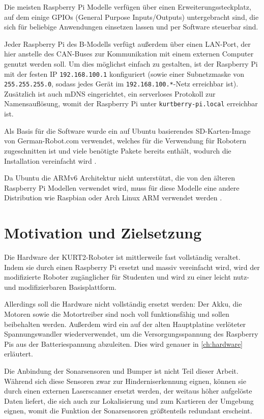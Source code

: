 \documentclass[german]{thesis_KBS}
\newcommand{\code}[1]{\texttt{#1}}  %
\begin{document}
Die meisten Raspberry Pi Modelle verfügen über einen Erweiterungssteckplatz, auf
dem einige GPIOs (General Purpose Inputs/Outputs) untergebracht sind, die sich
für beliebige Anwendungen einsetzen lassen und per Software steuerbar sind.

Jeder Raspberry Pi des B-Modells verfügt außerdem über einen LAN-Port, der hier
anstelle des CAN-Buses zur Kommunikation mit einem externen Computer genutzt
werden soll. Um dies möglichst einfach zu gestalten, ist der Raspberry Pi mit
der festen IP \code{192.168.100.1} konfiguriert (sowie einer Subnetzmaske von
\code{255.255.255.0}, sodass jedes Gerät im \code{192.168.100.*}-Netz erreichbar
ist). Zusätzlich ist auch mDNS eingerichtet, ein serverloses Protokoll zur
Namensauflösung, womit der Raspberry Pi unter \code{kurtberry-pi.local}
erreichbar ist.

Als Basis für die Software wurde ein auf Ubuntu basierendes SD-Karten-Image von
German-Robot.com verwendet, welches für die Verwendung für Robotern
zugeschnitten ist und viele benötigte Pakete bereits enthält, wodurch die
Installation vereinfacht wird \cite{pi-image}.

Da Ubuntu die ARMv6 Architektur nicht unterstützt, die von den älteren Raspberry
Pi Modellen verwendet wird, muss für diese Modelle eine andere Distribution wie
Raspbian oder Arch Linux ARM verwendet werden \cite{ubuntu-arm-support}
\cite{raspbian-arm-support} \cite{alarm-armv6-support}.


\section{Motivation und Zielsetzung}

Die Hardware der KURT2-Roboter ist mittlerweile fast vollständig veraltet. Indem
sie durch einen Raspberry Pi ersetzt und massiv vereinfacht wird, wird der
modifizierte Roboter zugänglicher für Studenten und wird zu einer leicht nutz-
und modifizierbaren Basisplattform.

Allerdings soll die Hardware nicht vollständig ersetzt werden: Der Akku, die
Motoren sowie die Motortreiber sind noch voll funktionsfähig und sollen
beibehalten werden. Außerdem wird ein auf der alten Hauptplatine verlöteter
Spannungswandler wiederverwendet, um die Versorgungsspannung des Raspberry Pis
aus der Batteriespannung abzuleiten. Dies wird genauer in \autoref{ch:hardware}
erläutert.

Die Anbindung der Sonarsensoren und Bumper ist nicht Teil dieser Arbeit. Während
sich diese Sensoren zwar zur Hinderniserkennung eignen, können sie durch einen
externen Laserscanner ersetzt werden, der weitaus höher aufgelöste Daten
liefert, die sich auch zur Lokalisierung und zum Kartieren der Umgebung eignen,
womit die Funktion der Sonarsensoren größtenteils redundant erscheint.
\end{document}

